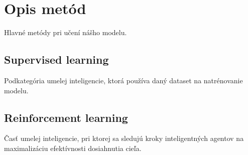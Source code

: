 \section{Opis metód}
Hlavné metódy pri učení nášho modelu.
\subsection{Supervised learning}
Podkategória umelej inteligencie, ktorá používa daný dataset na natrénovanie modelu.

\subsection{Reinforcement learning}
Časť umelej inteligencie, pri ktorej sa sledujú kroky inteligentných agentov na maximalizáciu efektívnosti dosiahnutia cieľa.

